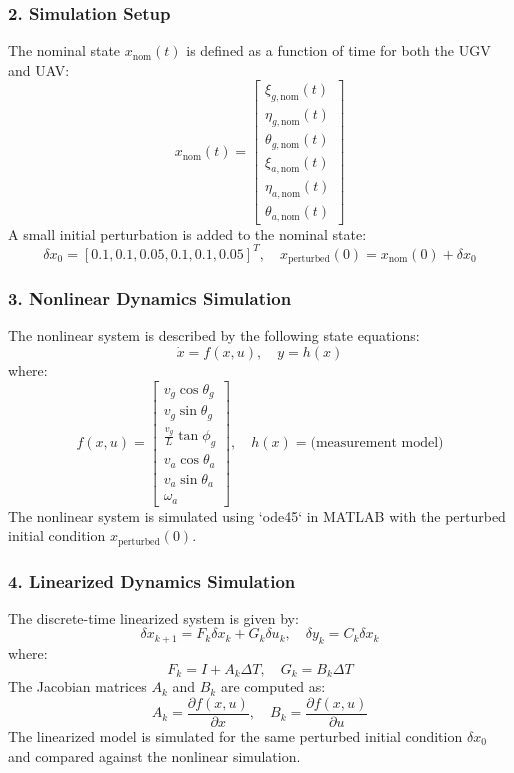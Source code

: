 \subsubsection*{2. Simulation Setup}
The nominal state \( x_{\text{nom}}(t) \) is defined as a function of time for both the UGV and UAV:
\[
x_{\text{nom}}(t) = 
\begin{bmatrix}
\xi_{g,\text{nom}}(t) \\ \eta_{g,\text{nom}}(t) \\ \theta_{g,\text{nom}}(t) \\ 
\xi_{a,\text{nom}}(t) \\ \eta_{a,\text{nom}}(t) \\ \theta_{a,\text{nom}}(t)
\end{bmatrix}
\]
A small initial perturbation is added to the nominal state:
\[
\delta x_0 = [0.1, 0.1, 0.05, 0.1, 0.1, 0.05]^T, \quad x_{\text{perturbed}}(0) = x_{\text{nom}}(0) + \delta x_0
\]

\subsubsection*{3. Nonlinear Dynamics Simulation}
The nonlinear system is described by the following state equations:
\[
\dot{x} = f(x, u), \quad y = h(x)
\]
where:
\[
f(x, u) = 
\begin{bmatrix}
v_g \cos\theta_g \\ 
v_g \sin\theta_g \\ 
\frac{v_g}{L} \tan\phi_g \\ 
v_a \cos\theta_a \\ 
v_a \sin\theta_a \\ 
\omega_a
\end{bmatrix}, \quad
h(x) = \text{(measurement model)}
\]
The nonlinear system is simulated using `ode45` in MATLAB with the perturbed initial condition \( x_{\text{perturbed}}(0) \).

\subsubsection*{4. Linearized Dynamics Simulation}
The discrete-time linearized system is given by:
\[
\delta x_{k+1} = F_k \delta x_k + G_k \delta u_k, \quad \delta y_k = C_k \delta x_k
\]
where:
\[
F_k = I + A_k \Delta T, \quad G_k = B_k \Delta T
\]
The Jacobian matrices \( A_k \) and \( B_k \) are computed as:
\[
A_k = \frac{\partial f(x, u)}{\partial x}, \quad B_k = \frac{\partial f(x, u)}{\partial u}
\]
The linearized model is simulated for the same perturbed initial condition \( \delta x_0 \) and compared against the nonlinear simulation.

